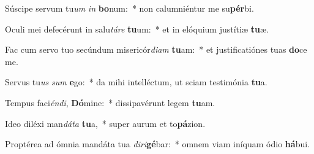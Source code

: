 \item Súscipe servum tu\textit{um} \textit{in} \textbf{bo}num:~* non calumniéntur me su\textbf{pér}bi.
\item Oculi mei defecérunt in salu\textit{tá}\textit{re} \textbf{tu}um:~* et in elóquium justítiæ \textbf{tu}æ.
\item Fac cum servo tuo secúndum misericór\textit{di}\textit{am} \textbf{tu}am:~* et justificatiónes tuas \textbf{do}ce me.
\item Servus tu\textit{us} \textit{sum} \textbf{e}go:~* da mihi intelléctum, ut sciam testimónia \textbf{tu}a.
\item Tempus faci\textit{én}\textit{di}, \textbf{Dó}mine:~* dissipavérunt legem \textbf{tu}am.
\item Ideo diléxi man\textit{dá}\textit{ta} \textbf{tu}a,~* super aurum et to\textbf{pá}zion.
\item Proptérea ad ómnia mandáta tua \textit{di}\textit{ri}\textbf{gé}bar:~* omnem viam iníquam ódio \textbf{há}bui.
